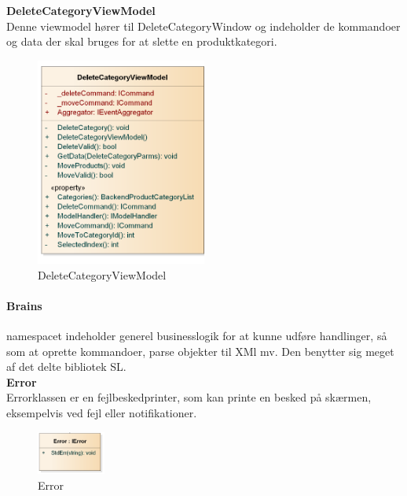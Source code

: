 \textbf{DeleteCategoryViewModel}\\
Denne viewmodel hører til DeleteCategoryWindow og indeholder de kommandoer og data der skal bruges for at slette en produktkategori.

\begin{figure}[H]
	\centering
	\includegraphics[width=0.5\textwidth]{Systemdesign/backend/klassebeskrivelser/Images/DeleteCategoryVM}
	\caption{DeleteCategoryViewModel}
	\label{fig:DeleteCategoryViewModel}
\end{figure}
\bigskip

\paragraph{Brains} namespacet indeholder generel businesslogik for at kunne udføre handlinger, så som at oprette kommandoer, parse objekter til XMl mv. Den benytter sig meget af det delte bibliotek \gls{SL}.\\

\textbf{Error}\\
Errorklassen er en fejlbeskedprinter, som kan printe en besked på skærmen, eksempelvis ved fejl eller notifikationer.
\begin{figure}[!h]
    \centering
    \includegraphics[width=0.2\textwidth]{Systemdesign/backend/klassebeskrivelser/Images/Error.png}
    \caption{Error}
    \label{fig:error}
\end{figure}
 \bigskip 
 
 
 
 
 
